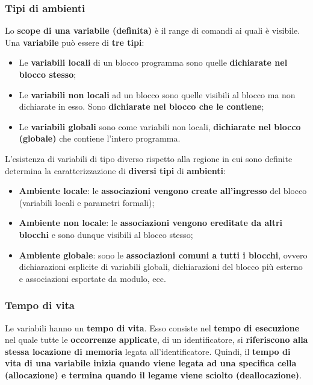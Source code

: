 \documentclass[a4paper]{article}
\begin{document}
 	\subsubsection{Tipi di ambienti}
 	
 	Lo \textbf{scope di una variabile (definita)} è il range di comandi ai quali è visibile. Una \textbf{variabile} può essere di \textbf{tre tipi}:
 	\begin{itemize}
 		\item Le \textcolor{Red3}{\textbf{variabili locali}} di un blocco programma sono quelle \textbf{dichiarate nel blocco stesso};
 		
 		\item Le \textcolor{Red3}{\textbf{variabili non locali}} ad un blocco sono quelle visibili al blocco ma non dichiarate in esso. Sono \textbf{dichiarate nel blocco che le contiene};
 		
 		\item Le \textcolor{Red3}{\textbf{variabili globali}} sono come variabili non locali, \textbf{dichiarate nel blocco (globale)} che contiene l'intero programma.
 	\end{itemize}
 	L'esistenza di variabili di tipo diverso rispetto alla regione in cui sono definite determina la caratterizzazione di \textbf{diversi tipi} di \textbf{ambienti}:
 	\begin{itemize}
 		\item \textcolor{Red3}{\textbf{Ambiente locale}}: le \textbf{associazioni vengono create all'ingresso} del blocco (variabili locali e parametri formali);
 		
 		\item \textcolor{Red3}{\textbf{Ambiente non locale}}: le \textbf{associazioni vengono ereditate da altri blocchi} e sono dunque visibili al blocco stesso;
 		
 		\item \textcolor{Red3}{\textbf{Ambiente globale}}: sono le \textbf{associazioni comuni a tutti i blocchi}, ovvero dichiarazioni esplicite di variabili globali, dichiarazioni del blocco più esterno e associazioni esportate da modulo, ecc.
 	\end{itemize}\newpage
 	
 	\subsubsection{Tempo di vita}
 	
 	Le variabili hanno un \textcolor{Red3}{\textbf{tempo di vita}}. Esso consiste nel \textbf{tempo di esecuzione} nel quale tutte le \textbf{occorrenze applicate}, di un identificatore, si \textbf{riferiscono alla stessa locazione di memoria} legata all'identificatore. Quindi, il \textbf{tempo di vita di una variabile inizia quando viene legata ad una specifica cella (allocazione) e termina quando il legame viene sciolto (deallocazione)}.\newline
 	
\end{document}
